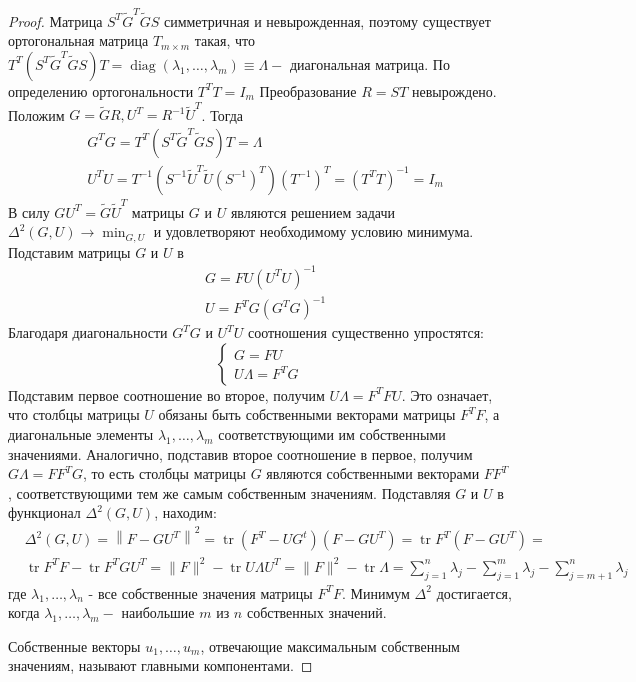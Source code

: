 {}\documentclass{article}
\begin{document}
\begin{proof}
Матрица $S^T \tilde{G}^T \tilde{G} S$ симметричная и невырожденная, поэтому существует ортогональная матрица
$T_{m \times m}$ такая, что $T^T\left(S^T \tilde{G}^T \tilde{G} S\right) T=\operatorname{diag}
\left(\lambda_1, \ldots, \lambda_m\right) \equiv \Lambda-$ диагональная матрица.
По определению ортогональности $T^T T=I_m$
Преобразование $R=S T$ невырождено.
Положим $G=\tilde{G} R, U^T=R^{-1} \tilde{U}^T$.
Тогда
\[
\begin{aligned}
&G^T G=T^T\left(S^T \tilde{G}^T \tilde{G} S\right) T=\Lambda \\
&U^T U=T^{-1}\left(S^{-1} \tilde{U}^T \tilde{U}\left(S^{-1}\right)^T\right)\left(T^{-1}\right)^T=\left(T^T T\right)^{-1}=I_m
\end{aligned}
\]
В силу $G U^T=\tilde{G} \tilde{U}^T$ матрицы $G$ и $U$ являются решением задачи $\Delta^2(G, U)
\rightarrow \min _{G, U}$ и удовлетворяют необходимому условию минимума. Подставим матрицы $G$ и $U$ в
\[
\begin{aligned}
&G=F U\left(U^T U\right)^{-1} \\
&U=F^T G\left(G^T G\right)^{-1}
\end{aligned}
\]
Благодаря диагональности $G^T G$ и $U^T U$ соотношения существенно упростятся:
\[
\left\{\begin{array}{l}
G=F U \\
U \Lambda=F^T G
\end{array}\right.
\]
Подставим первое соотношение во второе, получим $U \Lambda=F^T F U$.
Это означает, что столбцы матрицы $U$ обязаны быть собственными векторами матрицы $F^T F$,
а диагональные элементы $\lambda_1, \ldots, \lambda_m$ соответствующими им собственными значениями.
Аналогично, подставив второе соотношение в первое, получим $G \Lambda=F F^T G$,
то есть столбцы матрицы $G$ являются собственными векторами $F F^T$,
соответствующими тем же самым собственным значениям.
Подставляя $G$ и $U$ в функционал $\Delta^2(G, U)$, находим:
\[
\begin{aligned}
&\Delta^2(G, U)=\left\|F-G U^T\right\|^2=\operatorname{tr}\left(F^T-U G^t\right)\left(F-G U^T\right)=\operatorname{tr} F^T\left(F-G U^T\right)= \\
&\operatorname{tr} F^T F-\operatorname{tr} F^T G U^T=\|F\|^2-\operatorname{tr} U \Lambda U^T=\|F\|^2-\operatorname{tr} \Lambda=\sum_{j=1}^n \lambda_j-\sum_{j=1}^m \lambda_j-\sum_{j=m+1}^n \lambda_j
\end{aligned}
\]
где $\lambda_1, \ldots, \lambda_n$ - все собственные значения матрицы $F^T F$.
Минимум $\Delta^2$ достигается, когда $\lambda_1, \ldots, \lambda_m-$ наибольшие $m$ из $n$ собственных значений.

Собственные векторы $u_1, \ldots, u_m$, отвечающие максимальным собственным значениям, называют главными компонентами.
\end{proof}
\end{document}
